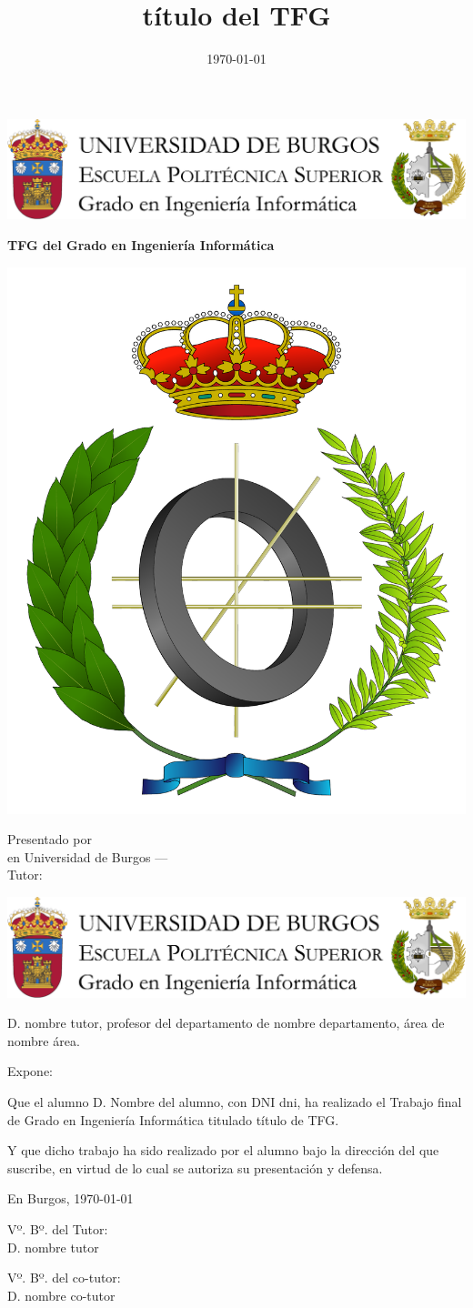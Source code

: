 \documentclass[a4paper,12pt,oneside]{memoir}
\title{título del TFG}
\author{\nombre}
\date{\today}
\makeatletter
\def\maketitle{
  \null
  \thispagestyle{empty}
\noindent\includegraphics[width=\textwidth]{cabecera}\vspace{1cm}%
  \vfill
  \colorbox{cpardoBox}{%
    \begin{minipage}{.8\textwidth}
      \vspace{.5cm}\Large
      \begin{center}
      \textbf{TFG del Grado en Ingeniería Informática}\vspace{.6cm}\\
      \textbf{\LARGE\@title{}}
      \end{center}
      \vspace{.2cm}
    \end{minipage}

  }%
  \hfill\begin{minipage}{.20\textwidth}
    \includegraphics[width=\textwidth]{escudoInfor}
  \end{minipage}
  \vfill
  \begin{center}%
  {%
    \noindent\LARGE
    Presentado por \@author{}\\ 
    en Universidad de Burgos --- \@date{}\\
    Tutor: \@tutor{}\\
  }%
  \end{center}%
  \null
  \cleardoublepage
  }
\newcommand{\nombre}{Nombre del alumno} %
\makeatother
\begin{document}
\maketitle


\newpage\null\thispagestyle{empty}\newpage


\thispagestyle{empty}


\noindent\includegraphics[width=\textwidth]{cabecera}\vspace{1cm}

\noindent D. nombre tutor, profesor del departamento de nombre departamento, área de nombre área.

\noindent Expone:

\noindent Que el alumno D. \nombre, con DNI dni, ha realizado el Trabajo final de Grado en Ingeniería Informática titulado título de TFG. 

\noindent Y que dicho trabajo ha sido realizado por el alumno bajo la dirección del que suscribe, en virtud de lo cual se autoriza su presentación y defensa.

\begin{center} %
En Burgos, {\large \today}
\end{center}

\vfill\vfill\vfill

\begin{minipage}{0.45\textwidth}
\begin{flushleft} %
Vº. Bº. del Tutor:\\[2cm]
D. nombre tutor
\end{flushleft}
\end{minipage}
\hfill
\begin{minipage}{0.45\textwidth}
\begin{flushleft} %
Vº. Bº. del co-tutor:\\[2cm]
D. nombre co-tutor
\end{flushleft}
\end{minipage}
\hfill

\vfill

\end{document}

